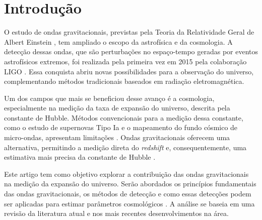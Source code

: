 \documentclass[12pt,oneside,a4paper,chapter=TITLE,section=TITLE,sumario
=tradicional]{abntex2}
\begin{document}

\imprimircapa
\imprimirfolhaderosto

\sumario

\textual

\chapter{Introdução}
\label{cap:introducao}


O estudo de ondas gravitacionais, previstas pela Teoria da Relatividade Geral de Albert Einstein \cite{bertolami2017}, tem ampliado o escopo da astrofísica e da cosmologia. A detecção dessas ondas, que são perturbações no espaço-tempo geradas por eventos astrofísicos extremos, foi realizada pela primeira vez em 2015 pela colaboração LIGO \cite{bertolami2017, aguiar2018}. Essa conquista abriu novas possibilidades para a observação do universo, complementando métodos tradicionais baseados em radiação eletromagnética.

Um dos campos que mais se beneficiou desse avanço é a cosmologia, especialmente na medição da taxa de expansão do universo, descrita pela constante de Hubble. Métodos convencionais para a medição dessa constante, como o estudo de supernovas Tipo Ia e o mapeamento do fundo cósmico de micro-ondas, apresentam limitações \cite{silva2021}. Ondas gravitacionais oferecem uma alternativa, permitindo a medição direta do \emph{redshift} e, consequentemente, uma estimativa mais precisa da constante de Hubble \cite{silva2021}.

Este artigo tem como objetivo explorar a contribuição das ondas gravitacionais na medição da expansão do universo. Serão abordados os princípios fundamentais das ondas gravitacionais, os métodos de detecção e como essas detecções podem ser aplicadas para estimar parâmetros cosmológicos \cite{ramos2019, silva2021}. A análise se baseia em uma revisão da literatura atual e nos mais recentes desenvolvimentos na área.
\end{document}
